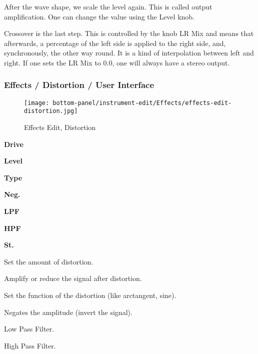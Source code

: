    After the wave shape, we scale the level again. This is called output
   amplification. One can change the value using the Level knob.

   Crossover is the last step. This is controlled by the knob LR Mix and
   means that afterwards, a percentage of the left side is applied to the
   right side, and, synchronously, the other way round. It is a kind of
   interpolation between left and right. If one sets the LR Mix to 0.0, one
   will always have a stereo output.

\subsubsection{Effects / Distortion / User Interface}
\label{subsubsec:effects_edit_distortion_ui}

\begin{figure}[H]
   \centering 
   \texttt{[image: bottom-panel/instrument-edit/Effects/effects-edit-distortion.jpg]}
   \caption{Effects Edit, Distortion}
   \label{fig:effects_edit_distortion}
\end{figure}

   \begin{enumber}
      \item \textbf{Drive}
      \item \textbf{Level}
      \item \textbf{Type}
      \item \textbf{Neg.}
      \item \textbf{LPF}
      \item \textbf{HPF}
      \item \textbf{St.}
   \end{enumber}

   \setcounter{ItemCounter}{0}      %

   Set the amount of distortion.

   Amplify or reduce the signal after distortion.

   Set the function of the distortion (like arctangent, sine).

   Negates the amplitude (invert the signal).

   Low Pass Filter.

   High Pass Filter.

